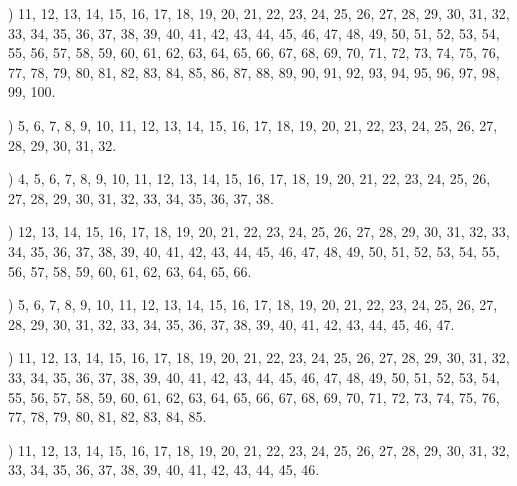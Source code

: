 \documentclass[a4paper,11pt]{article}
\begin{document}
\noindent
{}) 11, 12, 13, 14, 15, 16, 17, 18, 19, 20, 21, 22, 23,
24, 25, 26, 27, 28, 29, 30, 31, 32, 33, 34, 35, 36, 37, 38, 39, 40,
41, 42, 43, 44, 45, 46, 47, 48, 49, 50, 51, 52, 53, 54, 55, 56, 57,
58, 59, 60, 61, 62, 63, 64, 65, 66, 67, 68, 69, 70, 71, 72, 73, 74,
75, 76, 77, 78, 79, 80, 81, 82, 83, 84, 85, 86, 87, 88, 89, 90, 91,
92, 93, 94, 95, 96, 97, 98, 99, 100.

\vspace{\spaceFour}



\noindent
{}) 5, 6, 7, 8, 9, 10, 11, 12, 13, 14, 15, 16, 17, 18,
19, 20, 21, 22, 23, 24, 25, 26, 27, 28, 29, 30, 31, 32.

\vspace{\spaceFour}



\noindent
{}) 4, 5, 6, 7, 8, 9, 10, 11, 12, 13, 14, 15, 16, 17, 18,
19, 20, 21, 22, 23, 24, 25, 26, 27, 28, 29, 30, 31, 32, 33, 34, 35,
36, 37, 38.

\vspace{\spaceFour}



\noindent
{}) 12, 13, 14, 15, 16, 17, 18, 19, 20, 21, 22, 23, 24,
25, 26, 27, 28, 29, 30, 31, 32, 33, 34, 35, 36, 37, 38, 39, 40, 41,
42, 43, 44, 45, 46, 47, 48, 49, 50, 51, 52, 53, 54, 55, 56, 57, 58,
59, 60, 61, 62, 63, 64, 65, 66.

\vspace{\spaceFour}



\noindent
{}) 5, 6, 7, 8, 9, 10, 11, 12, 13, 14, 15, 16, 17, 18,
19, 20, 21, 22, 23, 24, 25, 26, 27, 28, 29, 30, 31, 32, 33, 34, 35,
36, 37, 38, 39, 40, 41, 42, 43, 44, 45, 46, 47.

\vspace{\spaceFour}



\noindent
{}) 11, 12, 13, 14, 15, 16, 17, 18, 19, 20, 21, 22, 23,
24, 25, 26, 27, 28, 29, 30, 31, 32, 33, 34, 35, 36, 37, 38, 39, 40,
41, 42, 43, 44, 45, 46, 47, 48, 49, 50, 51, 52, 53, 54, 55, 56, 57,
58, 59, 60, 61, 62, 63, 64, 65, 66, 67, 68, 69, 70, 71, 72, 73, 74,
75, 76, 77, 78, 79, 80, 81, 82, 83, 84, 85.

\vspace{\spaceFour}



\noindent
{}) 11, 12, 13, 14, 15, 16, 17, 18, 19, 20, 21, 22, 23,
24, 25, 26, 27, 28, 29, 30, 31, 32, 33, 34, 35, 36, 37, 38, 39, 40,
41, 42, 43, 44, 45, 46.
\end{document}
